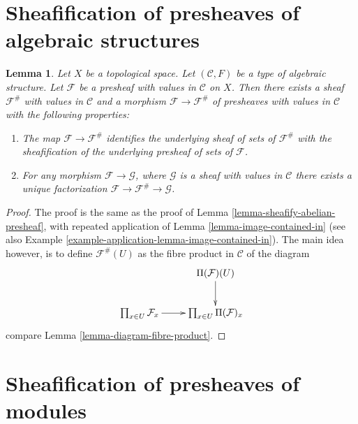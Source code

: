 \documentclass{stacks-project}
\theoremstyle{plain}
\newtheorem{lemma}[subsection]{Lemma}
\theoremstyle{definition}
\theoremstyle{remark}
\numberwithin{equation}{subsection}
\begin{document}
\section{Sheafification of presheaves of algebraic structures}
\label{section-sheafification-presheaves-structures}


\begin{lemma}
\label{lemma-sheafify-presheaf-structures}
Let $X$ be a topological space.
Let $(\mathcal{C}, F)$ be a type of algebraic structure.
Let $\mathcal{F}$ be a presheaf with values in $\mathcal{C}$
on $X$. Then there exists a sheaf $\mathcal{F}^\#$ with values
in $\mathcal{C}$ and a morphism $\mathcal{F} \to \mathcal{F}^\#$
of presheaves with values in $\mathcal{C}$ with the
following properties:
\begin{enumerate}
\item The map $\mathcal{F} \to \mathcal{F}^\#$ identifies
the underlying sheaf of sets of $\mathcal{F}^\#$ with
the sheafification of the underlying presheaf of sets of $\mathcal{F}$.
\item For any morphism $\mathcal{F} \to \mathcal{G}$, where
$\mathcal{G}$ is a sheaf with values in $\mathcal{C}$ there exists
a unique factorization $\mathcal{F} \to \mathcal{F}^\# \to \mathcal{G}$.
\end{enumerate}
\end{lemma}

\begin{proof}
The proof is the same as the proof of
Lemma \ref{lemma-sheafify-abelian-presheaf},
with repeated application of
Lemma \ref{lemma-image-contained-in} (see also
Example \ref{example-application-lemma-image-contained-in}).
The main idea however, is to define $\mathcal{F}^\#(U)$
as the fibre product in $\mathcal{C}$ of the diagram
$$
\xymatrix{
 &
\Pi(\mathcal{F})(U) \ar[d] \\
\prod_{x \in U} \mathcal{F}_x
\ar[r] &
\prod_{x \in U} \Pi(\mathcal{F})_x
}
$$
compare Lemma \ref{lemma-diagram-fibre-product}.
\end{proof}

\section{Sheafification of presheaves of modules}
\label{section-sheafification-presheaves-modules}
\end{document}
